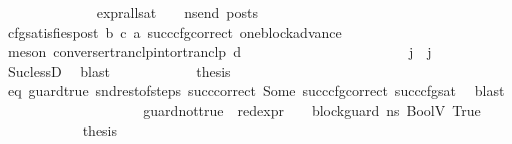 \begin{isabellebody}
\ \ \ \ \ \ \ \ \ \ \ \ \isamarkupfalse%
\ {\isachardoublequoteopen}{\isacharparenleft}{\kern0pt}expr{\isacharunderscore}{\kern0pt}all{\isacharunderscore}{\kern0pt}sat\ {\isasymLambda}\ {\isasymGamma}\ {\isasymOmega}\ ns{\isacharunderscore}{\kern0pt}end{\isacharparenright}{\kern0pt}\ posts{\isachardoublequoteclose}\ \isamarkupfalse%
\ cfg{\isacharunderscore}{\kern0pt}satisfies{\isacharunderscore}{\kern0pt}post\ b\ c\ a\ succ{\isacharunderscore}{\kern0pt}cfg{\isacharunderscore}{\kern0pt}correct\ one{\isacharunderscore}{\kern0pt}block{\isacharunderscore}{\kern0pt}advance\ \isanewline
\ \ \ \ \ \ \ \ \ \ \ \ \ \ \isamarkupfalse%
\ {\isacharparenleft}{\kern0pt}meson\ converse{\isacharunderscore}{\kern0pt}rtranclp{\isacharunderscore}{\kern0pt}into{\isacharunderscore}{\kern0pt}rtranclp\ d{\isacharparenright}{\kern0pt}\ \isanewline
\ \ \ \ \ \ \ \ \ \ \isamarkupfalse%
\isanewline
\isanewline
\ \ \ \ \ \ \ \ \ \ \isamarkupfalse%
\ {\isachardoublequoteopen}j{\isacharprime}{\kern0pt}\ {\isacharless}{\kern0pt}\ j{\isachardoublequoteclose}\ \isamarkupfalse%
\ {}\ \isamarkupfalse%
\ Suc{\isacharunderscore}{\kern0pt}lessD\ \isamarkupfalse%
\ blast\isanewline
\isanewline
\ \ \ \ \ \ \ \ \ \ \isamarkupfalse%
\ {\isacharquery}{\kern0pt}thesis\ \isamarkupfalse%
\ eq\ guard{\isacharunderscore}{\kern0pt}true\ snd{\isacharunderscore}{\kern0pt}rest{\isacharunderscore}{\kern0pt}of{\isacharunderscore}{\kern0pt}steps\ succ{\isacharunderscore}{\kern0pt}correct\ Some\ succ{\isacharunderscore}{\kern0pt}cfg{\isacharunderscore}{\kern0pt}correct\ succ{\isacharunderscore}{\kern0pt}cfg{\isacharunderscore}{\kern0pt}sat\ \isamarkupfalse%
\ blast\isanewline
\ \ \ \ \ \ \ \ \isamarkupfalse%
\isanewline
\ \ \ \ \ \ \ \ \ \ \isamarkupfalse%
\ guard{\isacharunderscore}{\kern0pt}not{\isacharunderscore}{\kern0pt}true{\isacharcolon}{\kern0pt}\ {\isachardoublequoteopen}{\isasymnot}\ {\isacharparenleft}{\kern0pt}red{\isacharunderscore}{\kern0pt}expr\ {\isasymLambda}\ {\isasymGamma}\ {\isasymOmega}\ block{\isacharunderscore}{\kern0pt}guard\ ns{}\ {\isacharparenleft}{\kern0pt}BoolV\ True{\isacharparenright}{\kern0pt}{\isacharparenright}{\kern0pt}{\isachardoublequoteclose}\isanewline
\ \ \ \ \ \ \ \ \ \ \isamarkupfalse%
\ {\isacharquery}{\kern0pt}thesis\ \isanewline
\ \ \ \ \ \ \ \ \ \ \isamarkupfalse%

\end{isabellebody}
